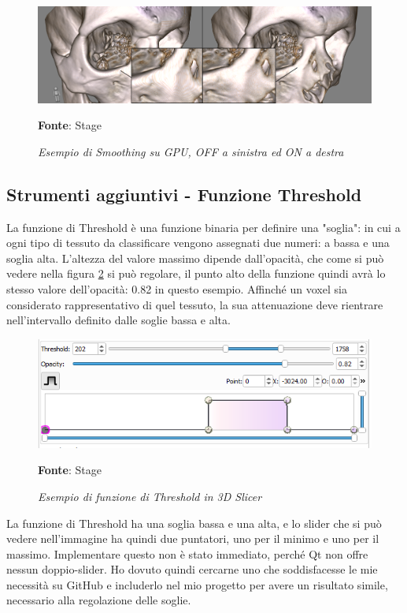 \begin{figure}[h]
    \centering
    \includegraphics[width=1\textwidth]{immagini/svolgimento/smoothing.png}
    \caption{\textit{Esempio di Smoothing su GPU, OFF a sinistra ed ON a destra}}
    \textbf{Fonte}: Stage
    \label{fig: smoothing}
\end{figure}

\subsection{Strumenti aggiuntivi - Funzione Threshold}
La funzione di Threshold è una funzione binaria per definire una "soglia": in cui a ogni tipo di tessuto da classificare vengono assegnati due numeri: a bassa e una soglia alta. L'altezza del valore massimo dipende dall'opacità, che come si può vedere nella figura \ref{fig: Threshold} si può regolare, il punto alto della funzione quindi avrà lo stesso valore dell'opacità: 0.82 in questo esempio. Affinché un voxel sia considerato rappresentativo di quel tessuto, la sua attenuazione deve rientrare nell'intervallo definito dalle soglie bassa e alta.

\begin{figure}[h]
    \centering
    \includegraphics[width=1\textwidth]{immagini/svolgimento/slicerthreshold.png}
    \caption{\textit{Esempio di funzione di Threshold in 3D Slicer}}
    \textbf{Fonte}: Stage
    \label{fig: Threshold}
\end{figure}

La funzione di Threshold ha una soglia bassa e una alta, e lo slider che si può vedere nell'immagine ha quindi due puntatori, uno per il minimo e uno per il massimo. Implementare questo non è stato immediato, perché Qt non offre nessun doppio-slider. Ho dovuto quindi cercarne uno che soddisfacesse le mie necessità su GitHub e includerlo nel mio progetto per avere un risultato simile, necessario alla regolazione delle soglie.

